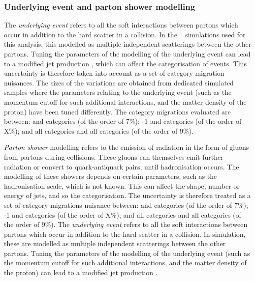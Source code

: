 \subsubsection{Underlying event and parton shower modelling}
\ifNewAnalysis
The \emph{underlying event} refers to all the soft interactions between partons which occur in addition to the hard scatter in a \pp collision. In the \Pythia~\cite{Pythia8} simulations used for this analysis, this modelled as multiple independent scatterings between the other partons. Tuning the parameters of the modelling of the underlying event can lead to a modified jet production \crosssection, which can affect the categorisation of \VBF events. This uncertainty is therefore taken into account as a set of category migration nuisances. The sizes of the variations are obtained from dedicated simulated samples where the parameters relating to the underlying event (such as the momentum cutoff for such additional interactions, and the matter density of the proton) have been tuned differently. The category migrations evaluated are between:  and   categories (of the order of 7\%); -1  and  categories (of the order of X\%); and all \VBFTag categories and all \Untagged categories (of the order of 9\%).

\emph{Parton shower} modelling refers to the emission of \QCD radiation in the form of gluons from partons during \pp collisions. These gluons can themselves emit further \QCD radiation or convert to quark-antiquark pairs, until hadronisation occurs. The modelling of these showers depends on certain parameters, such as the hadronisation scale, which is not known. This can affect the shape, number or energy of jets, and so the \VBF categorisation. The uncertainty is therefore treated as a set of category migrations nuisance between:  and  categories (of the order of 7\%); -1  and  categories (of the order of X\%); and all \VBFTag categories and all \Untagged categories (of the order of 9\%).
\else
The \emph{underlying event} refers to all the soft interactions between partons which occur in addition to the hard scatter in a \pp collision. In simulation, these are modelled as multiple independent scatterings between the other partons. Tuning the parameters of the modelling of the underlying event (such as the momentum cutoff for such additional interactions, and the matter density of the proton) can lead to a modified jet production \crosssection. %

